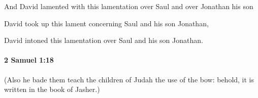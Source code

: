 			\begin{versebox}
					\item[BHS] 
					\item[ASV] And David lamented with this lamentation over Saul and over Jonathan his son
					\item[NIV] David took up this lament concerning Saul and his son Jonathan,
					\item[NRSV] David intoned this lamentation over Saul and his son Jonathan.
			\end{versebox}

		\paragraph{2 Samuel 1:18} %
			\label{2SAMUEL-1-18}

			(Also he bade them teach the children of Judah the use of the bow: behold, it is written in the book of Jasher.)

